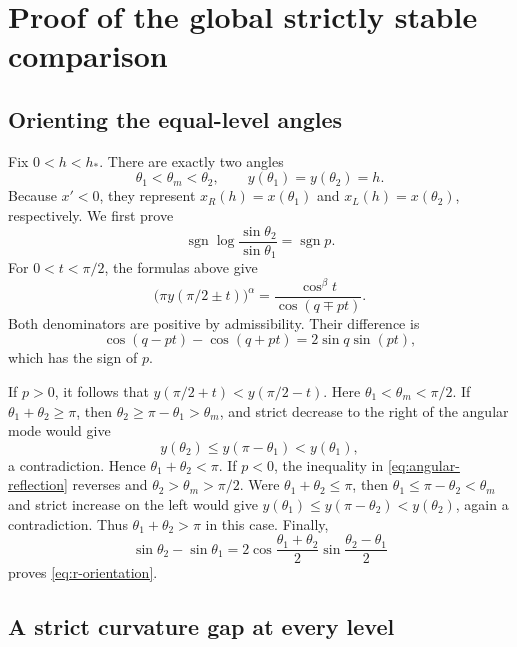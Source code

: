 \documentclass[11pt,a4paper]{article}
\theoremstyle{definition}
\theoremstyle{remark}
\numberwithin{equation}{section}
\newcommand{\sign}{\operatorname{sgn}}
\newcommand{\hp}{h_\ast}
\begin{document}
\section{Proof of the global strictly stable comparison}
\label{sec:strict-proof}

\subsection{Orienting the equal-level angles}

Fix $0<h<\hp$. There are exactly two angles
\[
 \theta_1<\theta_m<\theta_2,\qquad y(\theta_1)=y(\theta_2)=h .
\]
Because $x'<0$, they represent
$x_R(h)=x(\theta_1)$ and $x_L(h)=x(\theta_2)$, respectively.
We first prove
\begin{equation}\label{eq:r-orientation}
 \sign\log\frac{\sin\theta_2}{\sin\theta_1}=\sign p .
\end{equation}
For $0<t<\pi/2$, the formulas above give
\begin{equation}\label{eq:angular-reflection}
 \bigl(\pi y(\pi/2\pm t)\bigr)^\alpha
 =\frac{\cos^\beta t}{\cos(q\mp pt)}.
\end{equation}
Both denominators are positive by admissibility. Their difference is
\[
 \cos(q-pt)-\cos(q+pt)=2\sin q\sin(pt),
\]
which has the sign of $p$.

If $p>0$, it follows that $y(\pi/2+t)<y(\pi/2-t)$.
Here $\theta_1<\theta_m<\pi/2$. If
$\theta_1+\theta_2\ge\pi$, then
$\theta_2\ge\pi-\theta_1>\theta_m$, and strict decrease to the
right of the angular mode would give
\[
 y(\theta_2)\le y(\pi-\theta_1)<y(\theta_1),
\]
a contradiction. Hence $\theta_1+\theta_2<\pi$.
If $p<0$, the inequality in \eqref{eq:angular-reflection} reverses and
$\theta_2>\theta_m>\pi/2$. Were
$\theta_1+\theta_2\le\pi$, then
$\theta_1\le\pi-\theta_2<\theta_m$ and strict increase on the left
would give
$y(\theta_1)\le y(\pi-\theta_2)<y(\theta_2)$, again a contradiction.
Thus $\theta_1+\theta_2>\pi$ in this case. Finally,
\[
 \sin\theta_2-\sin\theta_1
 =2\cos\frac{\theta_1+\theta_2}{2}
       \sin\frac{\theta_2-\theta_1}{2}
\]
proves \eqref{eq:r-orientation}.

\subsection{A strict curvature gap at every level}
\end{document}

